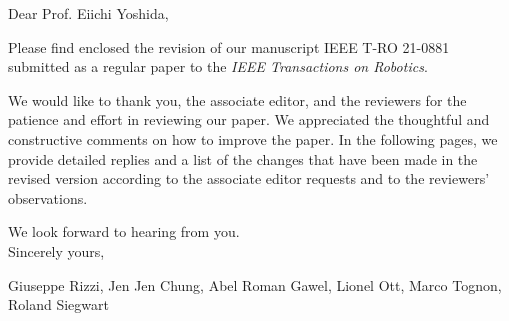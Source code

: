 \documentclass[10pt]{article}
\newcommand{\todo}[1]{\par\noindent{\color{mygreen}\raggedright\textsc{#1}\par\marginpar{\Large$\star\star$}}}
\newcommand{\journal}{IEEE Transactions on Robotics}
\newcommand{\journalRef}{IEEE T-RO 21-0881}
\newcommand{\editor}{Prof. Eiichi Yoshida}
\begin{document}
\bigskip



\noindent
Dear \editor,

\noindent
Please find enclosed the revision of our manuscript \journalRef{} submitted
as a regular paper to the \textit{\journal}.

\noindent
We would like to thank you, the associate editor, and the reviewers for the patience and effort in reviewing our paper. We appreciated the thoughtful and
constructive comments on how to improve the paper. In the following pages, we provide detailed replies and a list of the changes that have been made in the revised version according to the associate editor requests and to the reviewers' observations.

\noindent
We look forward to hearing from you.\\
Sincerely yours,


\begin{flushright}
Giuseppe Rizzi, Jen Jen Chung, Abel Roman Gawel, Lionel Ott, Marco Tognon, Roland Siegwart
\end{flushright}
\clearpage


%
%
%
%
%
%
%
%
\end{document}
